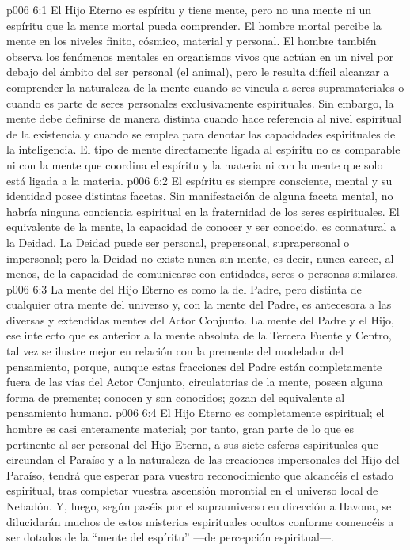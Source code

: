 \vs p006 6:1 El Hijo Eterno es espíritu y tiene mente, pero no una mente ni un espíritu que la mente mortal pueda comprender. El hombre mortal percibe la mente en los niveles finito, cósmico, material y personal. El hombre también observa los fenómenos mentales en organismos vivos que actúan en un nivel por debajo del ámbito del ser personal (el animal), pero le resulta difícil alcanzar a comprender la naturaleza de la mente cuando se vincula a seres supramateriales o cuando es parte de seres personales exclusivamente espirituales. Sin embargo, la mente debe definirse de manera distinta cuando hace referencia al nivel espiritual de la existencia y cuando se emplea para denotar las capacidades espirituales de la inteligencia. El tipo de mente directamente ligada al espíritu no es comparable ni con la mente que coordina el espíritu y la materia ni con la mente que solo está ligada a la materia.
\vs p006 6:2 El espíritu es siempre consciente, mental y su identidad posee distintas facetas. Sin manifestación de alguna faceta mental, no habría ninguna conciencia espiritual en la fraternidad de los seres espirituales. El equivalente de la mente, la capacidad de conocer y ser conocido, es connatural a la Deidad. La Deidad puede ser personal, prepersonal, suprapersonal o impersonal; pero la Deidad no existe nunca sin mente, es decir, nunca carece, al menos, de la capacidad de comunicarse con entidades, seres o personas similares.
\vs p006 6:3 La mente del Hijo Eterno es como la del Padre, pero distinta de cualquier otra mente del universo y, con la mente del Padre, es antecesora a las diversas y extendidas mentes del Actor Conjunto. La mente del Padre y el Hijo, ese intelecto que es anterior a la mente absoluta de la Tercera Fuente y Centro, tal vez se ilustre mejor en relación con la premente del modelador del pensamiento, porque, aunque estas fracciones del Padre están completamente fuera de las vías del Actor Conjunto, circulatorias de la mente, poseen alguna forma de premente; conocen y son conocidos; gozan del equivalente al pensamiento humano.
\vs p006 6:4 El Hijo Eterno es completamente espiritual; el hombre es casi enteramente material; por tanto, gran parte de lo que es pertinente al ser personal del Hijo Eterno, a sus siete esferas espirituales que circundan el Paraíso y a la naturaleza de las creaciones impersonales del Hijo del Paraíso, tendrá que esperar para vuestro reconocimiento que alcancéis el estado espiritual, tras completar vuestra ascensión morontial en el universo local de Nebadón. Y, luego, según paséis por el suprauniverso en dirección a Havona, se dilucidarán muchos de estos misterios espirituales ocultos conforme comencéis a ser dotados de la “mente del espíritu” ---de percepción espiritual---.
